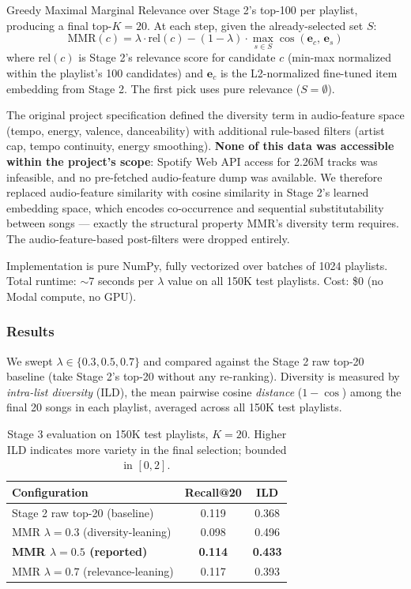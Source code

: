 \documentclass[11pt,a4paper]{article}
\begin{document}
Greedy Maximal Marginal Relevance over Stage 2's top-100 per playlist, producing a final top-$K=20$. At each step, given the already-selected set $S$:
\[
\text{MMR}(c) = \lambda \cdot \text{rel}(c) - (1 - \lambda) \cdot \max_{s \in S} \cos(\mathbf{e}_c,\, \mathbf{e}_s)
\]
where $\text{rel}(c)$ is Stage 2's relevance score for candidate $c$ (min-max normalized within the playlist's 100 candidates) and $\mathbf{e}_c$ is the L2-normalized fine-tuned item embedding from Stage 2. The first pick uses pure relevance ($S = \emptyset$).

The original project specification defined the diversity term in audio-feature space (tempo, energy, valence, danceability) with additional rule-based filters (artist cap, tempo continuity, energy smoothing). \textbf{None of this data was accessible within the project's scope}: Spotify Web API access for 2.26M tracks was infeasible, and no pre-fetched audio-feature dump was available. We therefore replaced audio-feature similarity with cosine similarity in Stage 2's learned embedding space, which encodes co-occurrence and sequential substitutability between songs --- exactly the structural property MMR's diversity term requires. The audio-feature-based post-filters were dropped entirely.

Implementation is pure NumPy, fully vectorized over batches of 1024 playlists. Total runtime: $\sim 7$ seconds per $\lambda$ value on all 150K test playlists. Cost: \$0 (no Modal compute, no GPU).

\subsubsection{Results}

We swept $\lambda \in \{0.3, 0.5, 0.7\}$ and compared against the Stage 2 raw top-20 baseline (take Stage 2's top-20 without any re-ranking). Diversity is measured by \emph{intra-list diversity} (ILD), the mean pairwise cosine \emph{distance} ($1 - \cos$) among the final 20 songs in each playlist, averaged across all 150K test playlists.

\begin{table}[H]
\centering
\begin{tabular}{lcc}
\toprule
\textbf{Configuration} & \textbf{Recall@20} & \textbf{ILD} \\
\midrule
Stage 2 raw top-20 (baseline) & 0.119 & 0.368 \\
MMR $\lambda = 0.3$ (diversity-leaning) & 0.098 & 0.496 \\
\textbf{MMR $\lambda = 0.5$ (reported)} & \textbf{0.114} & \textbf{0.433} \\
MMR $\lambda = 0.7$ (relevance-leaning) & 0.117 & 0.393 \\
\bottomrule
\end{tabular}
\caption{Stage 3 evaluation on 150K test playlists, $K=20$. Higher ILD indicates more variety in the final selection; bounded in $[0, 2]$.}
\label{tab:stage3_results}
\end{table}
\end{document}
